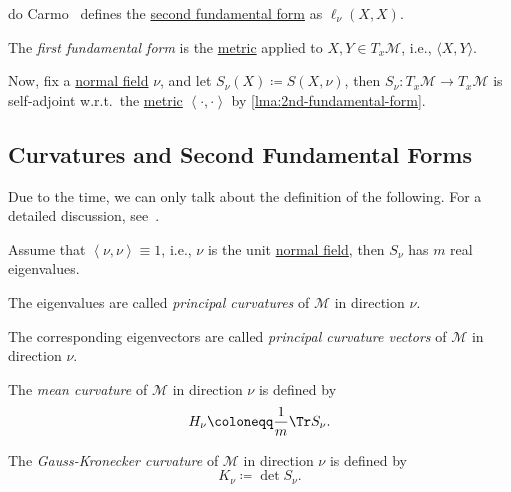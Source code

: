 \begin{note}
	do Carmo~\cite{flaherty2013riemannian} defines the \hyperref[def:2nd-fundamental-form]{second fundamental form} as \(\ell _\nu (X, X)\).
\end{note}

\begin{note}
	The \emph{first fundamental form} is the \hyperref[def:Riemannian-metric]{metric} applied to \(X, Y\in T_x \mathcal{M} \), i.e., \(\langle X, Y \rangle\).
\end{note}

Now, fix a \hyperref[not:normal-bundle]{normal field} \(\nu \), and let \(S_\nu (X) \coloneqq S(X, \nu )\), then \(S_\nu \colon T_x \mathcal{M} \to T_x \mathcal{M}\) is self-adjoint w.r.t.\ the \hyperref[def:Riemannian-metric]{metric} \(\left\langle \cdot, \cdot \right\rangle \) by \autoref{lma:2nd-fundamental-form}.

\subsection{Curvatures and Second Fundamental Forms}
Due to the time, we can only talk about the definition of the following. For a detailed discussion, see~\cite[ Example 2.4 -- Example 2.8]{flaherty2013riemannian}.

\begin{definition*}
	Assume that \(\left\langle \nu , \nu \right\rangle \equiv 1\), i.e., \(\nu \) is the unit \hyperref[not:normal-bundle]{normal field}, then \(S_\nu \) has \(m\) real eigenvalues.

	\begin{definition}\label{def:principal-curvature}
		The eigenvalues are called \emph{principal curvatures} of \(\mathcal{M} \) in direction \(\nu \).
	\end{definition}

	\begin{definition}\label{def:principal-curvature-vector}
		The corresponding eigenvectors are called \emph{principal curvature vectors} of \(\mathcal{M} \) in direction \(\nu \).
	\end{definition}
\end{definition*}


\begin{definition}\label{def:mean-curvature}
	The \emph{mean curvature} of \(\mathcal{M} \) in direction \(\nu \) is defined by
	\[
		H_\nu \coloneqq \frac{1}{m} \Tr S_\nu .
	\]
\end{definition}

\begin{definition}\label{def:Gauss-Kronecker-curvature}
	The \emph{Gauss-Kronecker curvature} of \(\mathcal{M} \) in direction \(\nu \) is defined by
	\[
		K _\nu \coloneqq \det S_\nu .
	\]
\end{definition}
